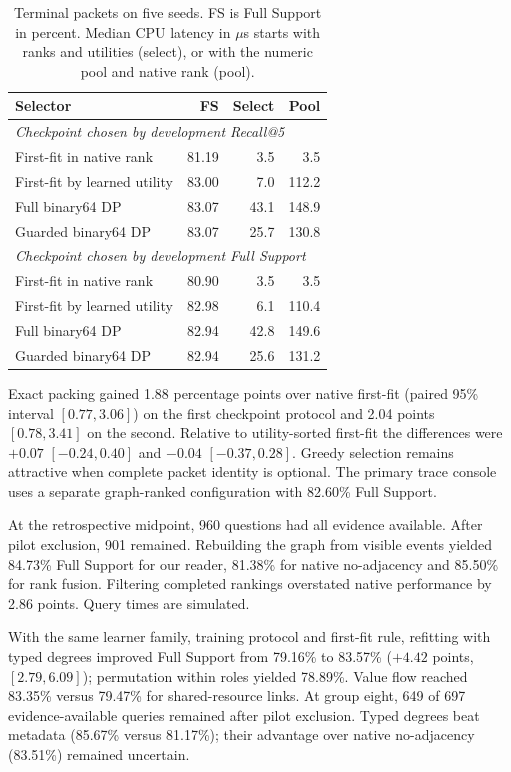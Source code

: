 \documentclass[conference]{IEEEtran}
\begin{document}
\begin{table}[t]
\caption{Terminal packets on five seeds. FS is Full Support in percent. Median CPU latency in $\mu$s starts with ranks and utilities (select), or with the numeric pool and native rank (pool).}
\centering\small
\begin{tabular}{@{}lrrr@{}}\toprule
Selector & FS & Select & Pool\\\midrule
\multicolumn{4}{l}{\textit{Checkpoint chosen by development Recall@5}}\\
First-fit in native rank & 81.19 & 3.5 & 3.5\\
First-fit by learned utility & 83.00 & 7.0 & 112.2\\
Full binary64 DP & 83.07 & 43.1 & 148.9\\
Guarded binary64 DP & 83.07 & 25.7 & 130.8\\\midrule
\multicolumn{4}{l}{\textit{Checkpoint chosen by development Full Support}}\\
First-fit in native rank & 80.90 & 3.5 & 3.5\\
First-fit by learned utility & 82.98 & 6.1 & 110.4\\
Full binary64 DP & 82.94 & 42.8 & 149.6\\
Guarded binary64 DP & 82.94 & 25.6 & 131.2\\
\bottomrule\end{tabular}
\label{tab:retrieval}
\end{table}

Exact packing gained 1.88 percentage points over native first-fit (paired 95\% interval $[0.77,3.06]$) on the first checkpoint protocol and 2.04 points $[0.78,3.41]$ on the second. Relative to utility-sorted first-fit the differences were $+0.07$ $[-0.24,0.40]$ and $-0.04$ $[-0.37,0.28]$. Greedy selection remains attractive when complete packet identity is optional. The primary trace console uses a separate graph-ranked configuration with 82.60\% Full Support.

At the retrospective midpoint, 960 questions had all evidence available. After pilot exclusion, 901 remained. Rebuilding the graph from visible events yielded 84.73\% Full Support for our reader, 81.38\% for native no-adjacency and 85.50\% for rank fusion. Filtering completed rankings overstated native performance by 2.86 points. Query times are simulated.

With the same learner family, training protocol and first-fit rule, refitting with typed degrees improved Full Support from 79.16\% to 83.57\% ($+4.42$ points, $[2.79,6.09]$); permutation within roles yielded 78.89\%. Value flow reached 83.35\% versus 79.47\% for shared-resource links. At group eight, 649 of 697 evidence-available queries remained after pilot exclusion. Typed degrees beat metadata (85.67\% versus 81.17\%); their advantage over native no-adjacency (83.51\%) remained uncertain.
\end{document}
